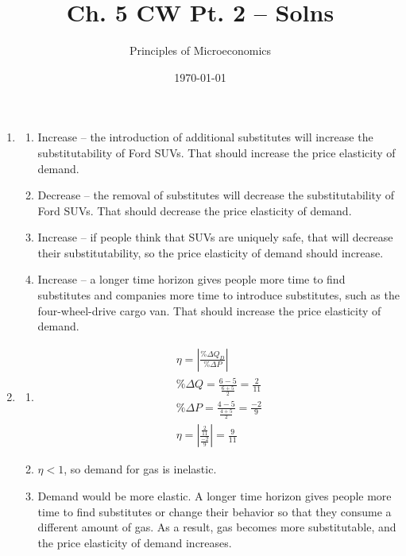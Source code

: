 \documentclass{article}
\title{Ch. 5 CW Pt. 2 -- Solns}
\author{Principles of Microeconomics}
\date{\today}
\begin{document}
\maketitle

\begin{enumerate}

\item

	\begin{enumerate}
	
	\item Increase -- the introduction of additional substitutes will increase the substitutability of Ford SUVs. That should increase the price elasticity of demand.
	
	\item Decrease -- the removal of substitutes will decrease the substitutability of Ford SUVs. That should decrease the price elasticity of demand.
	
	\item Increase -- if people think that SUVs are uniquely safe, that will decrease their substitutability, so the price elasticity of demand should increase.
	
	\item Increase -- a longer time horizon gives people more time to find substitutes and companies more time to introduce substitutes, such as the four-wheel-drive cargo van. That should increase the price elasticity of demand.
	
	\end{enumerate}
	
\item

	\begin{enumerate}
	
	\item
		\begin{gather*}
		\eta = \left| \frac{\% \Delta Q_D}{\% \Delta P} \right| \\
		\% \Delta Q = \frac{6 - 5}{\frac{6+5}{2}} = \frac{2}{11} \\
		\% \Delta P = \frac{4 - 5}{\frac{4+5}{2}} = \frac{-2}{9} \\
		\eta = \left| \frac{ \frac{2}{11} }{ \frac{-2}{9} } \right| = \frac{9}{11}
		\end{gather*}
		
	\item $\eta < 1$, so demand for gas is inelastic.
	
	\item Demand would be more elastic. A longer time horizon gives people more time to find substitutes or change their behavior so that they consume a different amount of gas. As a result, gas becomes more substitutable, and the price elasticity of demand increases.
	

\end{enumerate}
\end{enumerate}
\end{document}
